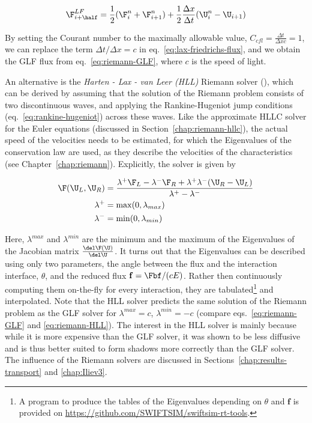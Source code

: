 \begin{align}
\F_{i+\half}^{LF} = \frac{1}{2} (\F^n_i + \F_{i+1}^n) + \frac{1}{2}\frac{\Delta x}{\Delta t} (
\U_i^n - \U_{i+1}) \label{eq:lax-friedrichs-flux}
\end{align}

By setting the Courant number to the maximally allowable value, $C_{cfl} = \frac{\Delta t}{\Delta x
c} = 1$, we can replace the term $\Delta t / \Delta x = c$ in eq.~\ref{eq:lax-friedrichs-flux},
and we obtain the GLF flux from eq.~\ref{eq:riemann-GLF}, where $c$ is the speed of light.




An alternative is the \emph{Harten - Lax - van Leer (HLL)} Riemann solver
(\cite{gonzalezHERACLESThreedimensionalRadiation2007}), which can be derived by assuming that the
solution of the Riemann problem consists of two discontinuous waves, and applying the
Rankine-Hugeniot jump conditions (eq.~\ref{eq:rankine-hugeniot}) across these waves. Like the
approximate HLLC solver for the Euler equations (discussed in Section~\ref{chap:riemann-hllc}), the
actual speed of the velocities needs to be estimated, for which the Eigenvalues of the conservation
law are used, as they describe the velocities of the characteristics (see
Chapter~\ref{chap:riemann}). Explicitly, the solver is given by

\begin{align}
	\F(\U_L, \U_R) &=
		\frac{ \lambda^{+} \F_{L} - \lambda^{-} \F_{R} +  \lambda^{+}
\lambda^{-} (\U_R - \U_L)}{ \lambda^{+} - \lambda^{-} }
\label{eq:riemann-HLL} \\
    \lambda^+ &= \max(0, \lambda_{max})\\
    \lambda^- &= \min(0, \lambda_{min})
\end{align}


Here, $\lambda^{max}$ and $\lambda^{min}$ are the minimum and the maximum of the Eigenvalues of the
Jacobian matrix $\frac{\del \F(\U)}{\del \U}$. It turns out that the Eigenvalues can be described
using only two parameters, the angle between the flux and the interaction interface, $\theta$, and
the reduced flux $\mathbf{f} = \Fbf / (cE)$. Rather then continuously computing them on-the-fly for
every interaction, they are tabulated\footnote{
A program to produce the tables of the Eigenvalues depending on $\theta$ and $\mathbf{f}$ is
provided on \url{https://github.com/SWIFTSIM/swiftsim-rt-tools}.
}
and interpolated. Note that the HLL solver predicts the same solution of the Riemann problem as the
GLF solver for $\lambda^{max} = c$, $\lambda^{min} = -c$ (compare eqs.~\ref{eq:riemann-GLF} and
\ref{eq:riemann-HLL}). The interest in the HLL solver is mainly because while it is more expensive
than the GLF solver, it was shown \citep{ramses-rt13, gonzalezHERACLESThreedimensionalRadiation2007}
to be less diffusive and is thus better suited to form shadows more correctly than the GLF solver.
The influence of the Riemann solvers are discussed in Sections~\ref{chap:results-transport} and
\ref{chap:Iliev3}.







